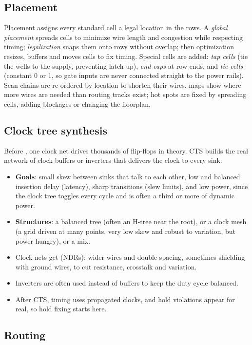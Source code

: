 \subsection*{Placement}

Placement assigns every standard cell a legal location in the rows. A \emph{global placement} spreads cells to minimize wire length and congestion while respecting timing; \emph{legalization} snaps them onto rows without overlap; then optimization resizes, buffers and moves cells to fix timing. Special cells are added: \emph{tap cells} (tie the wells to the supply, preventing latch-up), \emph{end caps} at row ends, and \emph{tie cells} (constant 0 or 1, so gate inputs are never connected straight to the power rails). Scan chains are re-ordered by location to shorten their wires.  maps show where more wires are needed than routing tracks exist; hot spots are fixed by spreading cells, adding blockages or changing the floorplan.

\subsection*{Clock tree synthesis}

Before , one clock net drives thousands of flip-flops in theory. CTS builds the real network of clock buffers or inverters that delivers the clock to every sink:
\begin{itemize}
  \item \textbf{Goals}: small skew between sinks that talk to each other, low and balanced insertion delay (latency), sharp transitions (slew limits), and low power, since the clock tree toggles every cycle and is often a third or more of dynamic power.
  \item \textbf{Structures}: a balanced tree (often an H-tree near the root), or a clock mesh (a grid driven at many points, very low skew and robust to variation, but power hungry), or a mix.
  \item Clock nets get  (NDRs): wider wires and double spacing, sometimes shielding with ground wires, to cut resistance, crosstalk and variation.
  \item Inverters are often used instead of buffers to keep the duty cycle balanced.
  \item After CTS, timing uses propagated clocks, and hold violations appear for real, so hold fixing starts here.
\end{itemize}

\subsection*{Routing}

